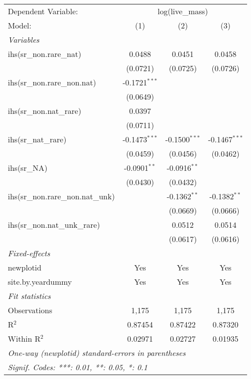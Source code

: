 \begin{tabular}{lccc}
\tabularnewline\midrule\midrule
Dependent Variable:&\multicolumn{3}{c}{log(live\_mass)}\\
Model:&(1) & (2) & (3)\\
\midrule \emph{Variables}&   &   &  \\
ihs(sr\_non.rare\_nat)&0.0488 & 0.0451 & 0.0458\\
  &(0.0721) & (0.0725) & (0.0726)\\
ihs(sr\_non.rare\_non.nat)&-0.1721$^{***}$ &    &   \\
  &(0.0649) &    &   \\
ihs(sr\_non.nat\_rare)&0.0397 &    &   \\
  &(0.0711) &    &   \\
ihs(sr\_nat\_rare)&-0.1473$^{***}$ & -0.1500$^{***}$ & -0.1467$^{***}$\\
  &(0.0459) & (0.0456) & (0.0462)\\
ihs(sr\_NA)&-0.0901$^{**}$ & -0.0916$^{**}$ &   \\
  &(0.0430) & (0.0432) &   \\
ihs(sr\_non.rare\_non.nat\_unk)&   & -0.1362$^{**}$ & -0.1382$^{**}$\\
  &   & (0.0669) & (0.0666)\\
ihs(sr\_non.nat\_unk\_rare)&   & 0.0512 & 0.0514\\
  &   & (0.0617) & (0.0616)\\
\midrule \emph{Fixed-effects}&   &   &  \\
newplotid & Yes & Yes & Yes\\
site.by.yeardummy & Yes & Yes & Yes\\
\midrule \emph{Fit statistics}&  & & \\
Observations & 1,175&1,175&1,175\\
R$^2$ & 0.87454&0.87422&0.87320\\
Within R$^2$ & 0.02971&0.02727&0.01935\\
\midrule\midrule\multicolumn{4}{l}{\emph{One-way (newplotid) standard-errors in parentheses}}\\
\multicolumn{4}{l}{\emph{Signif. Codes: ***: 0.01, **: 0.05, *: 0.1}}\\
\end{tabular}


